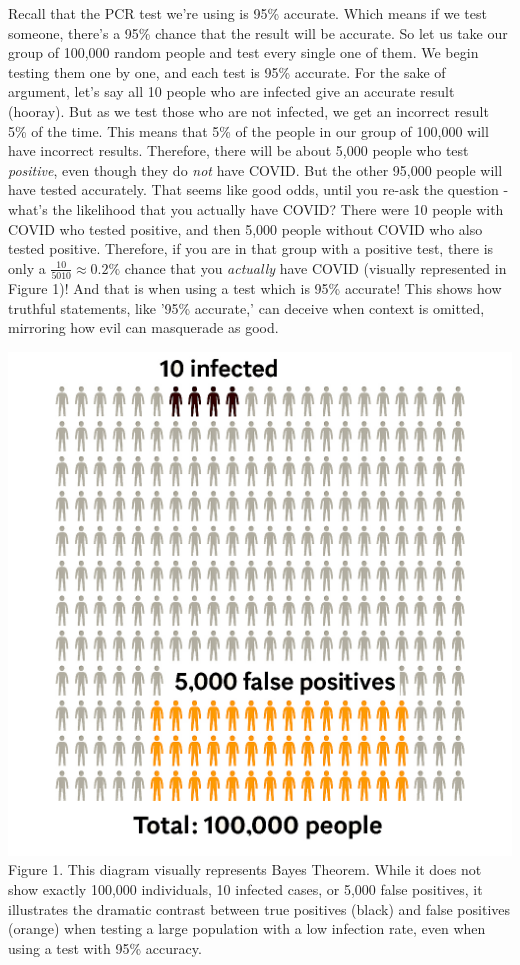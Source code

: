 \documentclass[10pt]{article}
\newenvironment{Figure}
  {\par\medskip\noindent\minipage{\linewidth}}
  {\endminipage\par\medskip}
\begin{document}
\begin{multicols}{2}
Recall that the PCR test we're using is 95\% accurate. Which means if we test someone, there's a 95\% chance that the result will be accurate. So let us take our group of 100,000 random people and test every single one of them. We begin testing them one by one, and each test is 95\% accurate. For the sake of argument, let's say all 10 people who are infected give an accurate result (hooray). But as we test those who are not infected, we get an incorrect result 5\% of the time. This means that 5\% of the people in our group of 100,000 will have incorrect results. Therefore, there will be about 5,000 people who test \textit{positive}, even though they do \textit{not} have COVID. But the other 95,000 people will have tested accurately. That seems like good odds, until you re-ask the question - what's the likelihood that you actually have COVID? There were 10 people with COVID who tested positive, and then 5,000 people without COVID who also tested positive. Therefore, if you are in that group with a positive test, there is only a $\frac{10}{5010} \approx 0.2\%$ chance that you \textit{actually} have COVID (visually represented in Figure 1)! And that is when using a test which is 95\% accurate! This shows how truthful statements, like '95\% accurate,' can deceive when context is omitted, mirroring how evil can masquerade as good.

\begin{Figure}
	\centering
	\includegraphics[width=\textwidth]{infection_diagram.jpg}
	{\footnotesize Figure 1. This diagram visually represents Bayes Theorem. While it does not show exactly 100,000 individuals, 10 infected cases, or 5,000 false positives, it illustrates the dramatic contrast between true positives (black) and false positives (orange) when testing a large population with a low infection rate, even when using a test with 95\% accuracy.}
\end{Figure}


\end{multicols}
\end{document}
